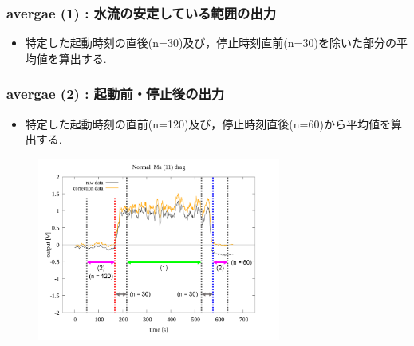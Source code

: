 \documentclass[twocolumn,a4j]{jsarticle}
\begin{document}
\subsubsection{avergae (1) : 水流の安定している範囲の出力}
\begin{itemize}
    \item 特定した起動時刻の直後(n=30)及び，停止時刻直前(n=30)を除いた部分の平均値を算出する.
\end{itemize}
\subsubsection{avergae (2) : 起動前・停止後の出力}
\begin{itemize}
    \item 特定した起動時刻の直前(n=120)及び，停止時刻直後(n=60)から平均値を算出する.
\end{itemize}
\begin{figure}[htbp]
    \footnotesize
    \begin{center}
        \includegraphics[width=80mm]{images/average.png}
    \end{center}
\end{figure}
\newpage
\end{document}

